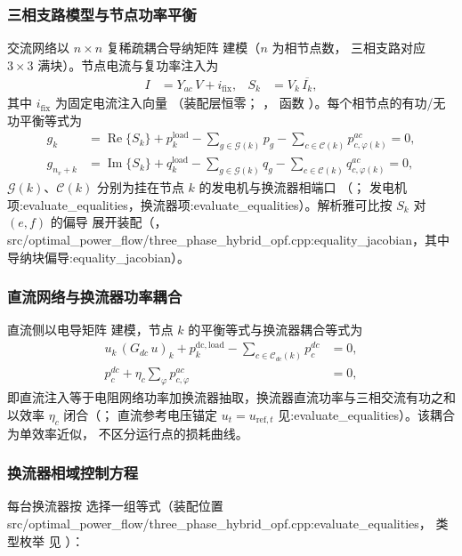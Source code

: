 \subsubsection*{三相支路模型与节点功率平衡}
交流网络以 $n\times n$ 复稀疏耦合导纳矩阵  建模（$n$ 为相节点数，
三相支路对应 $3\times 3$ 满块）。节点电流与复功率注入为
\begin{align*}
I &= Y_{ac}\,V + i_{\mathrm{fix}}, &
S_k &= V_k\,\overline{I_k},
\end{align*}
其中 $i_{\mathrm{fix}}$ 为固定电流注入向量 （装配层恒零；
，
函数 ）。每个相节点的有功/无功平衡等式为
\begin{align*}
g_k &= \operatorname{Re}\{S_k\} + p^{\mathrm{load}}_k
  - \sum_{g\in\mathcal{G}(k)} p_{g} - \sum_{c\in\mathcal{C}(k)} p^{ac}_{c,\varphi(k)} = 0,\\
g_{n_v+k} &= \operatorname{Im}\{S_k\} + q^{\mathrm{load}}_k
  - \sum_{g\in\mathcal{G}(k)} q_{g} - \sum_{c\in\mathcal{C}(k)} q^{ac}_{c,\varphi(k)} = 0,
\end{align*}
$\mathcal{G}(k)$、$\mathcal{C}(k)$ 分别为挂在节点 $k$ 的发电机与换流器相端口
（；
发电机项:evaluate\_equalities，换流器项:evaluate\_equalities）。解析雅可比按 $S_k$ 对 $(e,f)$ 的偏导
展开装配（，src/optimal\_power\_flow/three\_phase\_hybrid\_opf.cpp:equality\_jacobian，其中导纳块偏导:equality\_jacobian）。

\subsubsection*{直流网络与换流器功率耦合}
直流侧以电导矩阵  建模，节点 $k$ 的平衡等式与换流器耦合等式为
\begin{align*}
u_k\,(G_{dc}\,u)_k + p^{\mathrm{dc,load}}_k - \sum_{c\in\mathcal{C}_{dc}(k)} p^{dc}_c &= 0,\\
p^{dc}_c + \eta_c \sum_{\varphi} p^{ac}_{c,\varphi} &= 0,
\end{align*}
即直流注入等于电阻网络功率加换流器抽取，换流器直流功率与三相交流有功之和
以效率 $\eta_c$ 闭合（；
直流参考电压锚定 $u_t=u_{\mathrm{ref},t}$ 见:evaluate\_equalities）。该耦合为单效率近似，
不区分运行点的损耗曲线。

\subsubsection*{换流器相域控制方程}
每台换流器按  选择一组等式（装配位置 src/optimal\_power\_flow/three\_phase\_hybrid\_opf.cpp:evaluate\_equalities，
类型枚举  见 ）：

